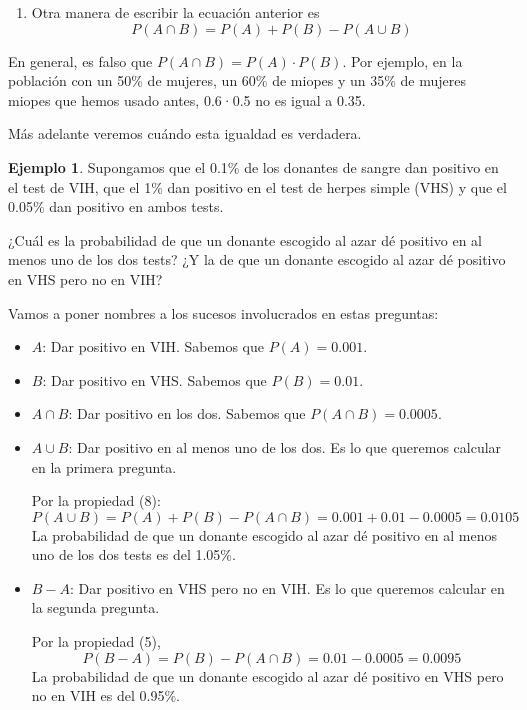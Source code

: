 \documentclass[
]{book}
\providecommand{\tightlist}{%
  \setlength{\itemsep}{0pt}\setlength{\parskip}{0pt}}
\theoremstyle{definition}
\theoremstyle{definition}
\newtheorem{example}{Ejemplo}[chapter]
\theoremstyle{definition}
\theoremstyle{definition}
\theoremstyle{remark}
\begin{document}
\begin{enumerate}
\def\labelenumi{\arabic{enumi}.}
\setcounter{enumi}{8}
\tightlist
\item
  Otra manera de escribir la ecuación anterior es
  \[
  P(A\cap B)=P(A)+P(B)-P(A \cup B)
  \]
\end{enumerate}

\begin{rmdcaution}
En general, es falso que \(P(A\cap B)=P(A)\cdot P(B)\). Por ejemplo, en la población con un 50\% de mujeres, un 60\% de miopes y un 35\% de mujeres miopes que hemos usado antes, 0.6·0.5 no es igual a 0.35.

Más adelante veremos cuándo esta igualdad es verdadera.
\end{rmdcaution}

\begin{example}
\protect\hypertarget{exm:VIHherpes1}{}\label{exm:VIHherpes1}Supongamos que el 0.1\% de los donantes de sangre dan positivo en el test de VIH, que el 1\% dan positivo en el test de herpes simple (VHS) y que el 0.05\% dan positivo en ambos tests.

¿Cuál es la probabilidad de que un donante escogido al azar dé positivo en al menos uno de los dos tests? ¿Y la de que un donante escogido al azar dé positivo en VHS pero no en VIH?
\end{example}

Vamos a poner nombres a los sucesos involucrados en estas preguntas:

\begin{itemize}
\item
  \(A\): Dar positivo en VIH. Sabemos que \(P(A)=0.001\).
\item
  \(B\): Dar positivo en VHS. Sabemos que \(P(B)=0.01\).
\item
  \(A\cap B\): Dar positivo en los dos. Sabemos que \(P(A\cap B)=0.0005\).
\item
  \(A\cup B\): Dar positivo en al menos uno de los dos. Es lo que queremos calcular en la primera pregunta.

  Por la propiedad (8):
  \[
  P(A \cup B) =P(A)+P(B)-P(A\cap B)=0.001+0.01-0.0005=0.0105
  \]
  La probabilidad de que un donante escogido al azar dé positivo en al menos uno de los dos tests es del 1.05\%.
\item
  \(B-A\): Dar positivo en VHS pero no en VIH. Es lo que queremos calcular en la segunda pregunta.

  Por la propiedad (5),
  \[
  P(B-A)=P(B)-P(A\cap B)=0.01-0.0005=0.0095
  \]
  La probabilidad de que un donante escogido al azar dé positivo en VHS pero no en VIH es del 0.95\%.
\end{itemize}
\end{document}
